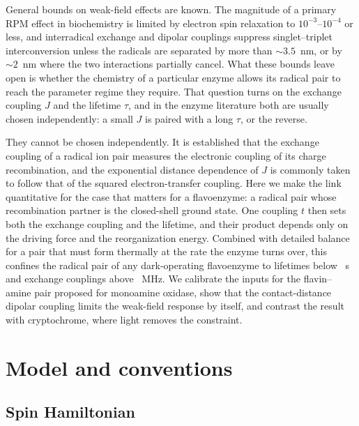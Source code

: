 \documentclass[journal=jpcbfk,manuscript=article,layout=traditional]{achemso}
\begin{document}
General bounds on weak-field effects are known. The magnitude of a primary RPM
effect in biochemistry is limited by electron spin relaxation to
$10^{-3}$--$10^{-4}$ or less,\cite{Binhi2025} and interradical exchange and
dipolar couplings suppress singlet--triplet interconversion unless the radicals
are separated by more than $\sim3.5$~nm, or by $\sim2$~nm where the two
interactions partially cancel.\cite{Efimova2008} What these bounds leave open is
whether the chemistry of a particular enzyme allows its radical pair to reach
the parameter regime they require. That question turns on the exchange coupling
$J$ and the lifetime $\tau$, and in the enzyme literature both are usually chosen
independently: a small $J$ is paired with a long $\tau$, or the reverse.

They cannot be chosen independently. It is established that the exchange
coupling of a radical ion pair measures the electronic coupling of its charge
recombination,\cite{Weiss2003} and the exponential distance dependence of $J$ is
commonly taken to follow that of the squared electron-transfer
coupling.\cite{Efimova2008} Here we make the link quantitative for the case that
matters for a flavoenzyme: a radical pair whose recombination partner is the
closed-shell ground state. One coupling $t$ then sets both the exchange coupling
and the lifetime, and their product depends only on the driving force and the
reorganization energy. Combined with detailed balance for a pair that must form
thermally at the rate the enzyme turns over, this confines the radical pair of
any dark-operating flavoenzyme to lifetimes below \tauCompMax~s and exchange
couplings above \JCompMin~MHz. We calibrate the inputs for the flavin--amine pair proposed
for monoamine oxidase, show that the contact-distance dipolar coupling limits
the weak-field response by itself, and contrast the result with cryptochrome,
where light removes the constraint.

\section{Model and conventions}

\subsection{Spin Hamiltonian}
\end{document}
